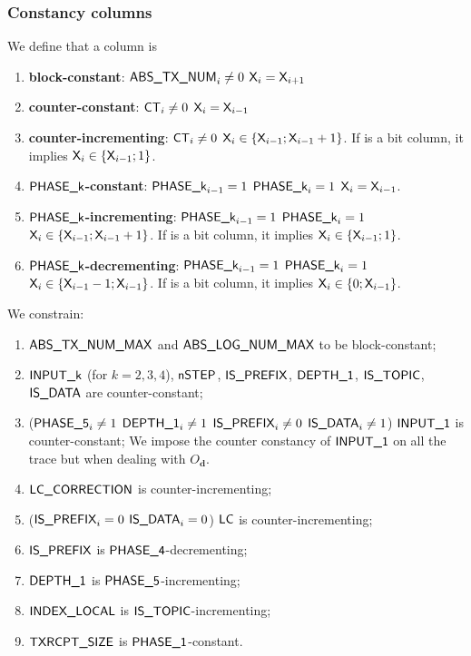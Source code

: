 \subsubsection{Constancy columns} \label{constancy_constraints}
We define that a column  is
\begin{enumerate}
    \item \textbf{block-constant}: \If $\textsf{ABS\_TX\_NUM}_{i} \neq 0$ \Then $\textsf{X}_{i}=\textsf{X}_{i+1}$
    \item \textbf{counter-constant}: \If $\textsf{CT}_{i} \neq 0$ \Then $\textsf{X}_{i}=\textsf{X}_{i-1}$
    \item \textbf{counter-incrementing}: \If $\textsf{CT}_{i} \neq 0$ \Then $\textsf{X}_{i} \in \{\textsf{X}_{i-1}; \textsf{X}_{i-1} +1 \}$. If  is a bit column, it implies $\textsf{X}_{i} \in \{\textsf{X}_{i-1}; 1 \}$.
    \item \textbf{$\bm{\textsf{PHASE\_k}}$-constant}: \If $\textsf{PHASE\_k}_{i-1} = 1$ \et $\textsf{PHASE\_k}_{i}=1$ \Then $\textsf{X}_{i}=\textsf{X}_{i-1}$.
    \item \textbf{$\textsf{PHASE\_k}$-incrementing}: \If $\textsf{PHASE\_k}_{i-1} = 1$ \et $\textsf{PHASE\_k}_{i}=1$ \Then $\textsf{X}_{i} \in \{\textsf{X}_{i-1}; \textsf{X}_{i-1} +1 \}$. If  is a bit column, it implies $\textsf{X}_{i} \in \{\textsf{X}_{i-1}; 1 \}$.
    \item \textbf{$\bm{\textsf{PHASE\_k}}$-decrementing}: \If $\textsf{PHASE\_k}_{i-1} = 1$ \et $\textsf{PHASE\_k}_{i}=1$ \Then $\textsf{X}_{i} \in \{\textsf{X}_{i-1} -1; \textsf{X}_{i-1} \}$. If  is a bit column, it implies $\textsf{X}_{i} \in \{0 ; \textsf{X}_{i-1}\}$.
\end{enumerate}

We constrain: 
\begin{enumerate}
    \item $\textsf{ABS\_TX\_NUM\_MAX}$ and $\textsf{ABS\_LOG\_NUM\_MAX}$ to be block-constant;
    \item $\textsf{INPUT\_k}$ (for $k= 2, 3, 4$), $\textsf{nSTEP}$, $\textsf{IS\_PREFIX}$, $\textsf{DEPTH\_1}$, $\textsf{IS\_TOPIC}$, $\textsf{IS\_DATA}$  are counter-constant;
    \item \If ($\textsf{PHASE\_5}_{i} \neq 1$ \Or $\textsf{DEPTH\_1}_{i} \neq 1$ \Or $\textsf{IS\_PREFIX}_{i} \neq 0$ \Or $\textsf{IS\_DATA}_{i} \neq 1$) \Then $\textsf{INPUT\_1}$ is counter-constant;
    \saNote{} We impose the counter constancy of $\textsf{INPUT\_1}$ on all the trace but when dealing with $O_{\textbf{d}}$.

    \item $\textsf{LC\_CORRECTION}$ is counter-incrementing;
    \item \If ($\textsf{IS\_PREFIX}_{i}=0$ \Or $\textsf{IS\_DATA}_{i}=0$) \Then $\textsf{LC}$ is counter-incrementing;
    \item $\textsf{IS\_PREFIX}$ is $\textsf{PHASE\_4}$-decrementing;
    \item $\textsf{DEPTH\_1}$ is $\textsf{PHASE\_5}$-incrementing;
    \item $\textsf{INDEX\_LOCAL}$ is $\textsf{IS\_TOPIC}$-incrementing;
    \item $\textsf{TXRCPT\_SIZE}$ is $\textsf{PHASE\_1}$-constant.
\end{enumerate}

